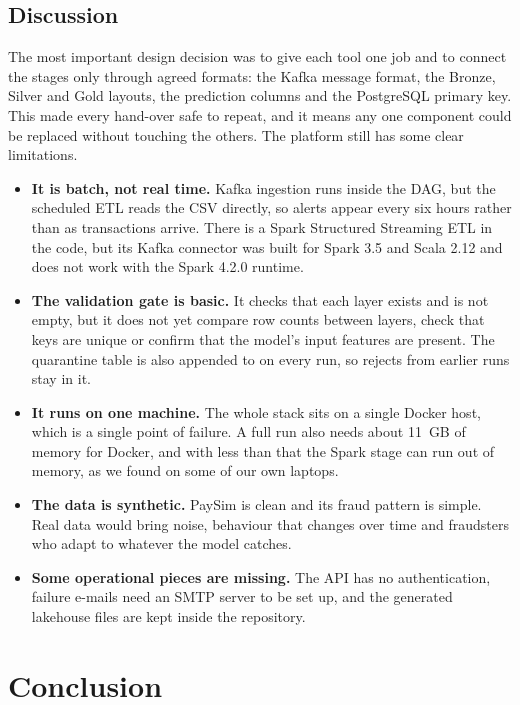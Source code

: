 \documentclass[11pt,a4paper]{article}
\begin{document}
\subsection{Discussion}
The most important design decision was to give each tool one job and to connect
the stages only through agreed formats: the Kafka message format, the Bronze,
Silver and Gold layouts, the prediction columns and the PostgreSQL primary key.
This made every hand-over safe to repeat, and it means any one component could be
replaced without touching the others. The platform still has some clear
limitations.
\begin{itemize}
  \item \textbf{It is batch, not real time.} Kafka ingestion runs inside the DAG,
        but the scheduled ETL reads the CSV directly, so alerts appear every six
        hours rather than as transactions arrive. There is a Spark Structured
        Streaming ETL in the code, but its Kafka connector was built for Spark 3.5
        and Scala 2.12 and does not work with the Spark 4.2.0 runtime.
  \item \textbf{The validation gate is basic.} It checks that each layer exists
        and is not empty, but it does not yet compare row counts between layers,
        check that keys are unique or confirm that the model's input features are
        present. The quarantine table is also appended to on every run, so rejects
        from earlier runs stay in it.
  \item \textbf{It runs on one machine.} The whole stack sits on a single Docker
        host, which is a single point of failure. A full run also needs about
        11~GB of memory for Docker, and with less than that the Spark stage can
        run out of memory, as we found on some of our own laptops.
  \item \textbf{The data is synthetic.} PaySim is clean and its fraud pattern is
        simple. Real data would bring noise, behaviour that changes over time and
        fraudsters who adapt to whatever the model catches.
  \item \textbf{Some operational pieces are missing.} The API has no
        authentication, failure e-mails need an SMTP server to be set up, and the
        generated lakehouse files are kept inside the repository.
\end{itemize}

\section{Conclusion}
\end{document}
